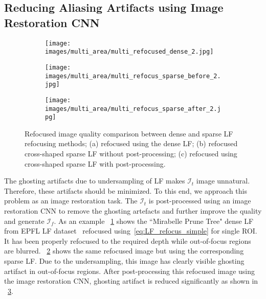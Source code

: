 \subsection{Reducing Aliasing Artifacts using Image Restoration CNN} \label{sec:cnn}

\begin{figure*}[!t]
    \centering

    \begin{subfigure}[c]{0.64\columnwidth}
         \centering
         \texttt{[image: images/multi\_area/multi\_refocused\_dense\_2.jpg]}
         \caption{}
         \label{fig:dense_refocused_img}
     \end{subfigure}
     \hfill
    \begin{subfigure}[c]{0.64\columnwidth}
         \centering
         \texttt{[image: images/multi\_area/multi\_refocus\_sparse\_before\_2.jpg]}
         \caption{}
         \label{fig:sparse_before_cnn}
     \end{subfigure}
     \hfill
     \begin{subfigure}[c]{0.64\columnwidth}
         \centering
         \texttt{[image: images/multi\_area/multi\_refocus\_sparse\_after\_2.jpg]}
         \caption{}
         \label{fig:sparse_after_cnn}
     \end{subfigure}
    \caption{Refocused image quality comparison between dense and sparse LF refocusing methods; (a) refocused using the dense LF; (b) refocused cross-shaped sparse LF without post-processing; (c) refocused using cross-shaped sparse LF with post-processing.}
    \label{fig:denseSparsPostProcess}
\end{figure*}

The ghosting artifacts due to undersampling of LF makes $\mathcal{I}_t$ image unnatural. Therefore, these artifacts should be minimized. To this end, we approach this problem as an image restoration task. The  $\mathcal{I}_t$ is post-processed using an image restoration CNN to remove the ghosting artefacts and further improve the quality and generate $\mathcal{I}_f$. As an example \figurename~\ref{fig:dense_refocused_img} shows the ``Mirabelle Prune Tree" dense LF from EPFL LF dataset~\cite{epfldataset} refocused using~\eqref{eq:LF_refocus_simple} for single ROI. It has been properly refocused to the required depth while out-of-focus regions are blurred. \figurename~\ref{fig:sparse_before_cnn} shows the same refocused image but using the corresponding sparse LF. Due to the undersampling, this image has clearly visible ghosting artifact in out-of-focus regions. After post-processing this refocused image using the image restoration CNN, ghosting artifact is reduced significantly as shown in \figurename~\ref{fig:sparse_after_cnn}. 

